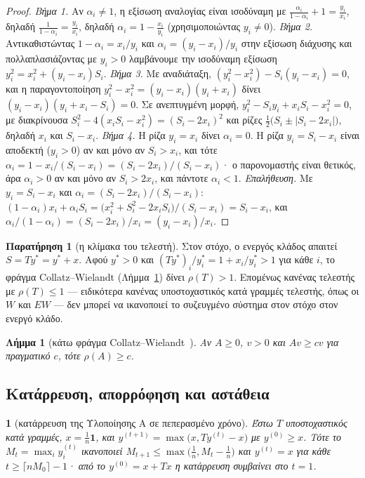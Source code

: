 \documentclass[11pt,a4paper]{article}
\newtheorem{lemma}{Λήμμα}
\theoremstyle{definition}
\newtheorem{remark}{Παρατήρηση}
\theoremstyle{plain}
\newcommand{\genpropname}{}
\newtheorem*{genprop}{\genpropname}
\newenvironment{prop}[1]{\renewcommand{\genpropname}{Πρόταση #1}\begin{genprop}}{\end{genprop}}
\newcommand{\one}{\mathbf{1}}
\begin{document}
\begin{proof}
\emph{Βήμα 1.} Αν $\alpha_i\ne1$, η εξίσωση αναλογίας είναι ισοδύναμη με $\frac{\alpha_i}{1-\alpha_i}+1=\frac{y_i}{x_i}$, δηλαδή $\frac1{1-\alpha_i}=\frac{y_i}{x_i}$, δηλαδή $\alpha_i=1-\frac{x_i}{y_i}$ (χρησιμοποιώντας $y_i\ne0$). \emph{Βήμα 2.} Αντικαθιστώντας $1-\alpha_i=x_i/y_i$ και $\alpha_i=(y_i-x_i)/y_i$ στην εξίσωση διάχυσης και πολλαπλασιάζοντας με $y_i>0$ λαμβάνουμε την ισοδύναμη εξίσωση $y_i^2=x_i^2+(y_i-x_i)S_i$. \emph{Βήμα 3.} Με αναδιάταξη, $(y_i^2-x_i^2)-S_i(y_i-x_i)=0$, και η παραγοντοποίηση $y_i^2-x_i^2=(y_i-x_i)(y_i+x_i)$ δίνει $(y_i-x_i)(y_i+x_i-S_i)=0$. Σε ανεπτυγμένη μορφή, $y_i^2-S_iy_i+x_iS_i-x_i^2=0$, με διακρίνουσα $S_i^2-4(x_iS_i-x_i^2)=(S_i-2x_i)^2$ και ρίζες $\tfrac12\big(S_i\pm|S_i-2x_i|\big)$, δηλαδή $x_i$ και $S_i-x_i$. \emph{Βήμα 4.} Η ρίζα $y_i=x_i$ δίνει $\alpha_i=0$. Η ρίζα $y_i=S_i-x_i$ είναι αποδεκτή ($y_i>0$) αν και μόνο αν $S_i>x_i$, και τότε $\alpha_i=1-x_i/(S_i-x_i)=(S_i-2x_i)/(S_i-x_i)$· ο παρονομαστής είναι θετικός, άρα $\alpha_i>0$ αν και μόνο αν $S_i>2x_i$, και πάντοτε $\alpha_i<1$. \emph{Επαλήθευση.} Με $y_i=S_i-x_i$ και $\alpha_i=(S_i-2x_i)/(S_i-x_i)$: $(1-\alpha_i)x_i+\alpha_iS_i=\big(x_i^2+S_i^2-2x_iS_i\big)/(S_i-x_i)=S_i-x_i$, και $\alpha_i/(1-\alpha_i)=(S_i-2x_i)/x_i=(y_i-x_i)/x_i$.
\end{proof}

\begin{remark}[η κλίμακα του τελεστή]\label{rem:scale}
Στον στόχο, ο ενεργός κλάδος απαιτεί $S=Ty^*=y^*+x$. Αφού $y^*>0$ και $(Ty^*)_i/y^*_i=1+x_i/y^*_i>1$ για κάθε $i$, το φράγμα Collatz--Wielandt (Λήμμα~\ref{lem:cw}) δίνει $\rho(T)>1$. Επομένως κανένας τελεστής με $\rho(T)\le1$ --- ειδικότερα κανένας υποστοχαστικός κατά γραμμές τελεστής, όπως οι $W$ και $EW$ --- δεν μπορεί να ικανοποιεί το συζευγμένο σύστημα στον στόχο στον ενεργό κλάδο.
\end{remark}

\begin{lemma}[κάτω φράγμα Collatz--Wielandt~{\cite[Θεώρ.~8.1.26]{hornjohnson13}}]\label{lem:cw}
Αν $A\ge0$, $v>0$ και $Av\ge cv$ για πραγματικό $c$, τότε $\rho(A)\ge c$.
\end{lemma}

\subsection{Κατάρρευση, απορρόφηση και αστάθεια}

\begin{prop}{A}[κατάρρευση της Υλοποίησης Α σε πεπερασμένο χρόνο]
Έστω $T$ υποστοχαστικός κατά γραμμές, $x=\tfrac1n\one$, και $y^{(t+1)}=\max\big(x,Ty^{(t)}-x\big)$ με $y^{(0)}\ge x$. Τότε το $M_t=\max_iy_i^{(t)}$ ικανοποιεί $M_{t+1}\le\max\big(\tfrac1n,M_t-\tfrac1n\big)$ και $y^{(t)}=x$ για κάθε $t\ge\lceil nM_0\rceil-1$· από το $y^{(0)}=x+Tx$ η κατάρρευση συμβαίνει στο $t=1$.
\end{prop}
\end{document}
